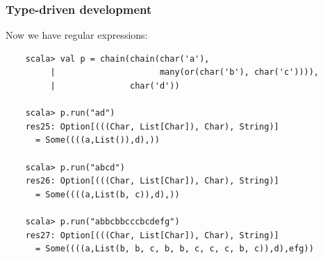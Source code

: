 \documentclass{beamer}
\begin{document}
\begin{frame}[containsverbatim]
  \frametitle{Type-driven development} 

  Now we have regular expressions:

  \begin{lstlisting}
    scala> val p = chain(chain(char('a'), 
         |                     many(or(char('b'), char('c')))),
         |               char('d'))

    scala> p.run("ad")
    res25: Option[(((Char, List[Char]), Char), String)] 
      = Some((((a,List()),d),))

    scala> p.run("abcd")
    res26: Option[(((Char, List[Char]), Char), String)] 
      = Some((((a,List(b, c)),d),))

    scala> p.run("abbcbbcccbcdefg")
    res27: Option[(((Char, List[Char]), Char), String)] 
      = Some((((a,List(b, b, c, b, b, c, c, c, b, c)),d),efg))
  \end{lstlisting}
  
\end{frame}






    

\end{document}
